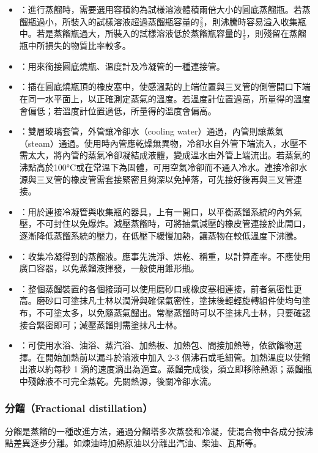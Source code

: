 \documentclass[a4paper,12pt]{article}
\begin{document}
\begin{itemize}
\bit
\item {}：進行蒸餾時，需要選用容積約為試様溶液體積兩倍大小的圓底蒸餾瓶。若蒸餾瓶過小，所裝入的試樣溶液超過蒸餾瓶容量的\(\frac{2}{3}\)，則沸騰時容易溢入收集瓶中。若是蒸餾瓶過大，所裝入的試樣溶液低於蒸餾瓶容量的\(\frac{1}{3}\)，則殘留在蒸餾瓶中所損失的物質比率較多。
\item {}：用來銜接圓底燒瓶、溫度計及冷凝管的一種連接管。
\item {}：插在圓底燒瓶頂的橡皮塞中，使感溫點的上端位置與三叉管的側管開口下端在同一水平面上，以正確測定蒸氣的溫度。若溫度計位置過高，所量得的溫度會偏低；若溫度計位置過低，所量得的溫度會偏高。
\item {}：雙層玻璃套管，外管讓冷卻水（cooling water）通過，內管則讓蒸氣（steam）通過。使用時內管應乾燥無異物，冷卻水自外管下端流入，水壓不需太大，將內管的蒸氣冷卻凝結成液體，變成溫水由外管上端流出。若蒸氣的沸點高於100°C或在常溫下為固體，可用空氣冷卻而不通入冷水。連接冷卻水源與三叉管的橡皮管需套接緊密且夠深以免掉落，可先接好後再與三叉管連接。
\item {}：用於連接冷凝管與收集瓶的器具，上有一開口，以平衡蒸餾系統的內外氣壓，不可封住以免爆炸。減壓蒸餾時，可將抽氣減壓的橡皮管連接於此開口，逐漸降低蒸餾系統的壓力，在低壓下緩慢加熱，讓蒸物在較低溫度下沸騰。
\item {}：收集冷凝得到的蒸餾液。應事先洗淨、烘乾、稱重，以計算產率。不應使用廣口容器，以免蒸餾液揮發，一般使用錐形瓶。
\item {}：整個蒸餾裝置的各個接頭可以使用磨砂口或橡皮塞相連接，前者氣密性更高。磨砂口可塗抹凡士林以潤滑與確保氣密性，塗抹後輕輕旋轉組件使均勻塗布，不可塗太多，以免隨蒸氣餾出。常壓蒸餾時可以不塗抹凡士林，只要確認接合緊密即可；減壓蒸餾則需塗抹凡士林。
\item {}：可使用水浴、油浴、蒸汽浴、加熱板、加熱包、間接加熱等，依欲餾物選擇。在開始加熱前以漏斗於溶液中加入 2-3 個沸石或毛細管。加熱溫度以使餾出液以約每秒 1 滴的速度滴出為適宜。蒸餾完成後，須立即移除熱源；蒸餾瓶中殘餘液不可完全蒸乾。先關熱源，後關冷卻水流。
\end{itemize}
\subsubsection{分餾（Fractional distillation）}
分餾是蒸餾的一種改進方法，通過分餾塔多次蒸發和冷凝，使混合物中各成分按沸點差異逐步分離。如煉油時加熱原油以分離出汽油、柴油、瓦斯等。
\end{document}
